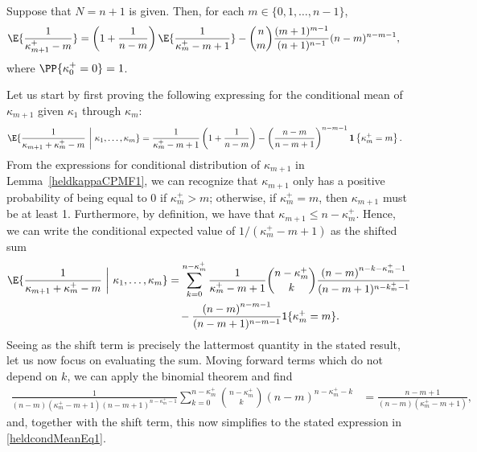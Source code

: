 \begin{lemma}\label{heldmeanRecur1}
Suppose that $N = n +1$ is given. Then, for each $m \in \{0, 1, \dots, n - 1\}$,
\begin{align}
\E{\frac{1}{\kappa_{m+1}^+ - m} }
&=
\left(1 + \frac{1}{n-m}\right)\E{\frac{1}{\kappa_m^+ - m + 1}}
-
{n \choose m}\frac{(m+1)^{m-1}}{(n+1)^{n-1}}(n-m)^{n-m-1}
,
\end{align}
where $\PP{\kappa_0^+ = 0} = 1$.
\end{lemma}
 Let us start by first proving the following expressing for the conditional mean of $\kappa_{m+1}$ given $\kappa_1$ through $\kappa_m$:
\begin{align}
\E{\frac{1}{\kappa_{m+1} + \kappa_m^+ - m} ~\bigg|~ \kappa_1, \dots, \kappa_m}
&=
\frac{1}{\kappa_m^+ - m + 1}\left(1 + \frac{1}{n-m}\right)
-
\left(\frac{n-m}{n-m+1}\right)^{n-m-1}\mathbf{1}\left\{ \kappa_m^+ = m\right\}
\label{heldcondMeanEq1}
.
\end{align}
From the expressions for conditional distribution of $\kappa_{m+1}$ in Lemma~\ref{heldkappaCPMF1}, we can recognize that $\kappa_{m+1}$ only has a positive probability of being equal to 0 if $\kappa_m^+ > m$; otherwise, if $\kappa_m^+ = m$, then $\kappa_{m+1}$ must be at least 1. Furthermore, by definition, we have that $\kappa_{m+1} \leq n - \kappa_m^+$. Hence, we can write the conditional expected value of $1/(\kappa_m^+ - m + 1)$ as the shifted sum
\begin{align}
\E{\frac{1}{\kappa_{m+1} + \kappa_m^+ - m} ~\bigg|~ \kappa_1, \dots, \kappa_m}
&=
\sum_{k=0}^{n-\kappa_m^+}
\frac{1}{\kappa_m^+ - m + 1}
{n - \kappa_m^+ \choose k}
\frac{\left(n-m\right)^{n-k-\kappa_{m}^+-1}}{(n-m+1)^{n-k_m^+-1}}
\nonumber
\\
&
\quad
-
\frac{\left(n-m\right)^{n-m-1}}{(n-m+1)^{n-m-1}}
\mathsf{1}\{\kappa_m^+ = m\}
.
\end{align}
Seeing as the shift term is precisely the lattermost quantity in the stated result, let us now focus on evaluating the sum. Moving forward terms which do not depend on $k$, we can apply the binomial theorem and find
\begin{align}
\frac{1}{(n-m)(\kappa_m^+ - m + 1)(n-m+1)^{n-\kappa_m^+-1}}
\sum_{k=0}^{n-\kappa_m^+}
{n - \kappa_m^+ \choose k}
\left(n-m\right)^{n-\kappa_{m}^+-k}
&=
\frac{n-m+1}{(n-m)(\kappa_m^+ - m + 1)}
,
\end{align}
and, together with the shift term, this now simplifies to the stated expression in \eqref{heldcondMeanEq1}.

